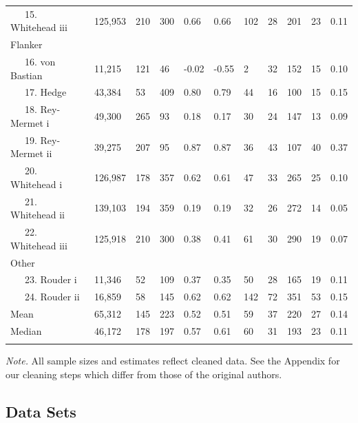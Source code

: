 \documentclass[
  ,man]{apa6}
\begin{document}
\begin{table}[tbp]
\begin{center}
\begin{threeparttable}
\begin{tabular}{lllllllllll}
\ \ \ 15. Whitehead iii & 125,953 & 210 & 300 & 0.66 & 0.66 & 102 & 28 & 201 & 23 & 0.11\\
Flanker &  &  &  &  &  &  &  &  &  & \\
\ \ \ 16. von Bastian & 11,215 & 121 & 46 & -0.02 & -0.55 & 2 & 32 & 152 & 15 & 0.10\\
\ \ \ 17. Hedge & 43,384 & 53 & 409 & 0.80 & 0.79 & 44 & 16 & 100 & 15 & 0.15\\
\ \ \ 18. Rey-Mermet i & 49,300 & 265 & 93 & 0.18 & 0.17 & 30 & 24 & 147 & 13 & 0.09\\
\ \ \ 19. Rey-Mermet ii & 39,275 & 207 & 95 & 0.87 & 0.87 & 36 & 43 & 107 & 40 & 0.37\\
\ \ \ 20. Whitehead i & 126,987 & 178 & 357 & 0.62 & 0.61 & 47 & 33 & 265 & 25 & 0.10\\
\ \ \ 21. Whitehead ii & 139,103 & 194 & 359 & 0.19 & 0.19 & 32 & 26 & 272 & 14 & 0.05\\
\ \ \ 22. Whitehead iii & 125,918 & 210 & 300 & 0.38 & 0.41 & 61 & 30 & 290 & 19 & 0.07\\
Other &  &  &  &  &  &  &  &  &  & \\
\ \ \ 23. Rouder i & 11,346 & 52 & 109 & 0.37 & 0.35 & 50 & 28 & 165 & 19 & 0.11\\
\ \ \ 24. Rouder ii & 16,859 & 58 & 145 & 0.62 & 0.62 & 142 & 72 & 351 & 53 & 0.15\\ \midrule
Mean & 65,312 & 145 & 223 & 0.52 & 0.51 & 59 & 37 & 220 & 27 & 0.14\\
Median & 46,172 & 178 & 197 & 0.57 & 0.61 & 60 & 31 & 193 & 23 & 0.11\\
\bottomrule
\addlinespace
\end{tabular}

\begin{tablenotes}[para]
\normalsize{\textit{Note.} All sample sizes and estimates reflect cleaned data.  See the Appendix for our cleaning steps which differ from those of the original authors.}
\end{tablenotes}

\end{threeparttable}
\end{center}

\end{table}

\hypertarget{data-sets}{%
\subsection{Data Sets}\label{data-sets}}
\end{document}
